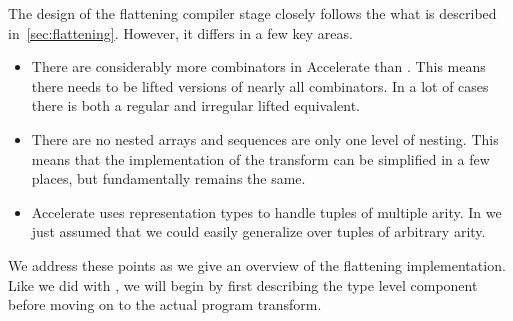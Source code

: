The design of the flattening compiler stage closely follows the what is described in~\ref{sec:flattening}. However, it differs in a few key areas.
%
\begin{itemize}
\item There are considerably more combinators in Accelerate than \ndp{}. This means there needs to be lifted versions of nearly all combinators. In a lot of cases there is both a regular and irregular lifted equivalent.
%
%
\item There are no nested arrays and sequences are only one level of nesting. This means that the implementation of the transform can be simplified in a few places, but fundamentally remains the same.
%
%
\item Accelerate uses representation types to handle tuples of multiple arity. In \ndp{} we just assumed that we could easily generalize over tuples of arbitrary arity.
%
\end{itemize}
%
We address these points as we give an overview of the flattening implementation. Like we did with \ndp{}, we will begin by first describing the type level component before moving on to the actual program transform.

